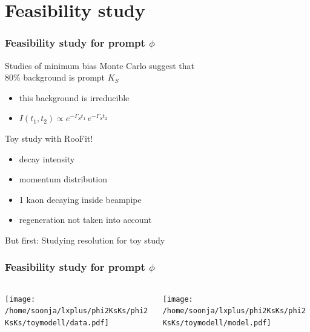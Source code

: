 \documentclass{beamer}
\begin{document}
\section{Feasibility study}





\LogoOff
\begin{frame}[fragile]
\frametitle{Feasibility study for prompt $\phi$}

Studies of minimum bias Monte Carlo suggest that \\80\% background is prompt $K_S$
\begin{itemize}
\item this background is irreducible
\item $I(t_1,t_2) \propto e^{-\Gamma_St_1} \,e^{-\Gamma_St_2}$
\end{itemize}
\vspace*{6pt}
Toy study with RooFit!
\begin{itemize}
\item decay intensity
\item momentum distribution
\item 1 kaon decaying inside beampipe
\item regeneration not taken into account
\end{itemize}
\vspace*{6pt}
But first: Studying resolution for toy study
\end{frame}




\begin{frame}[fragile]
\frametitle{Feasibility study for prompt $\phi$}

\begin{columns}
\begin{column}{.5\textwidth}
\texttt{[image: /home/soonja/lxplus/phi2KsKs/phi2KsKs/toymodell/data.pdf]}
\end{column}

\begin{column}{.5\textwidth}
\texttt{[image: /home/soonja/lxplus/phi2KsKs/phi2KsKs/toymodell/model.pdf]}
\end{column}
\end{columns}

\end{frame}
\end{document}
